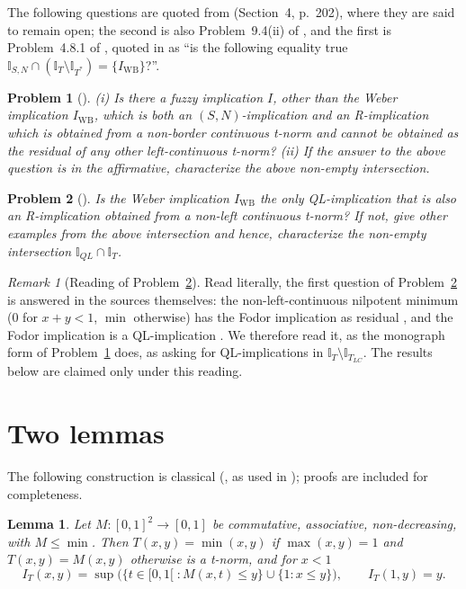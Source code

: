 \documentclass[11pt]{amsart}
\newtheorem{lemma}[theorem]{Lemma}
\newtheorem{problem}{Problem}
\theoremstyle{remark}
\newtheorem{remark}[theorem]{Remark}
\newcommand{\IWB}{I_{\mathrm{WB}}}
\newcommand{\cI}{\mathbb{I}}
\begin{document}
The following questions are quoted from \cite{BJ2013} (Section~4, p.~202),
where they are said to remain open; the second is also Problem~9.4(ii) of
\cite{BJ2010}, and the first is Problem~4.8.1 of \cite{BJ2008book}, quoted in
\cite[\S3.1.3]{BJ2013} as ``is the following equality true
$\cI_{S,N}\cap(\cI_T\setminus\cI_{T^*})=\{\IWB\}$?''.

\begin{problem}[{\cite[Problem 4.2]{BJ2013}}]\label{pr:sn}
(i) Is there a fuzzy implication $I$, other than the Weber implication
$\IWB$, which is both an $(S,N)$-implication and an R-implication which is
obtained from a non-border continuous t-norm and cannot be obtained as the
residual of any other left-continuous t-norm? (ii) If the answer to the above
question is in the affirmative, characterize the above non-empty
intersection.
\end{problem}

\begin{problem}[{\cite[Problem 4.5(ii)]{BJ2013}}]\label{pr:ql}
Is the Weber implication $\IWB$ the only QL-implication that is also an
R-implication obtained from a non-left continuous t-norm? If not, give other
examples from the above intersection and hence, characterize the non-empty
intersection $\cI_{QL}\cap\cI_T$.
\end{problem}

\begin{remark}[Reading of Problem~\ref{pr:ql}]
Read literally, the first question of Problem~\ref{pr:ql} is answered in the
sources themselves: the non-left-continuous nilpotent minimum ($0$ for
$x+y<1$, $\min$ otherwise) has the Fodor implication as residual
\cite[p.~189]{BJ2013}, and the Fodor implication is a QL-implication
\cite[Table~6, Proposition~6.4]{BJ2010}. We therefore read it, as the
monograph form of Problem~\ref{pr:sn} does, as asking for QL-implications in
$\cI_T\setminus\cI_{T_{LC}}$. The results below are claimed only under this
reading.
\end{remark}

\section{Two lemmas}

The following construction is classical (\cite[Corollary~1.8]{KMP}, as used in
\cite[\S4, (5)--(6)]{JBM2011}); proofs are included for completeness.

\begin{lemma}\label{lem:drastic}
Let $M:[0,1]^2\to[0,1]$ be commutative, associative, non-decreasing, with
$M\le\min$. Then $T(x,y)=\min(x,y)$ if $\max(x,y)=1$ and $T(x,y)=M(x,y)$
otherwise is a t-norm, and for $x<1$
\[
  I_T(x,y)=\sup\bigl(\{t\in[0,1[\;: M(x,t)\le y\}\cup\{1: x\le y\}\bigr),
  \qquad I_T(1,y)=y .
\]
\end{lemma}
\end{document}

